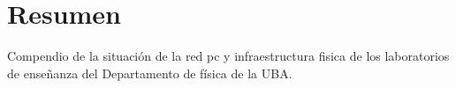 \thispagestyle{plain}
\chapter[Resumen]{Resumen}
Compendio de la situación de la red pc y infraestructura fisica de los laboratorios de enseñanza del Departamento de física de la UBA.
\label{cp:Resumen}